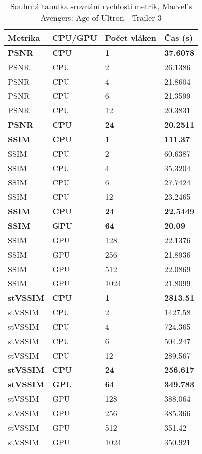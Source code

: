 \documentclass[thesis=M,czech]{FITthesis}[2016/06/26]
\begin{document}
\begin{table}[]
\centering
\begin{tabular}{|l|l|l|l|}
\hline
Metrika & CPU/GPU & Počet vláken & Čas (s) \\ \hline
\textbf{PSNR}    & \textbf{CPU}     & \textbf{1}            & \textbf{37.6078} \\ \hline
PSNR    & CPU     & 2            & 26.1386 \\ \hline
PSNR    & CPU     & 4            & 21.8604 \\ \hline
PSNR    & CPU     & 6            & 21.3599 \\ \hline
PSNR    & CPU     & 12           & 20.3831 \\ \hline
\textbf{PSNR}    & \textbf{CPU}     & \textbf{24}           & \textbf{20.2511} \\ \hline
\textbf{SSIM}    & \textbf{CPU}     & \textbf{1}            & \textbf{111.37}  \\ \hline
SSIM    & CPU     & 2            & 60.6387 \\ \hline
SSIM    & CPU     & 4            & 35.3204 \\ \hline
SSIM    & CPU     & 6            & 27.7424 \\ \hline
SSIM    & CPU     & 12           & 23.2465 \\ \hline
\textbf{SSIM}    & \textbf{CPU}     & \textbf{24}           & \textbf{22.5449} \\ \hline
\textbf{SSIM}    & \textbf{GPU}     & \textbf{64}           & \textbf{20.09}   \\ \hline
SSIM    & GPU     & 128          & 22.1376 \\ \hline
SSIM    & GPU     & 256          & 21.8936 \\ \hline
SSIM    & GPU     & 512          & 22.0869 \\ \hline
SSIM    & GPU     & 1024         & 21.8099 \\ \hline
\textbf{stVSSIM} & \textbf{CPU}     & \textbf{1}            & \textbf{2813.51} \\ \hline
stVSSIM & CPU     & 2            & 1427.58 \\ \hline
stVSSIM & CPU     & 4            & 724.365 \\ \hline
stVSSIM & CPU     & 6            & 504.247 \\ \hline
stVSSIM & CPU     & 12           & 289.567 \\ \hline
\textbf{stVSSIM} & \textbf{CPU}     & \textbf{24}           & \textbf{256.617} \\ \hline
\textbf{stVSSIM} & \textbf{GPU}     & \textbf{64}          & \textbf{349.783} \\ \hline
stVSSIM & GPU     & 128          & 388.064 \\ \hline
stVSSIM & GPU     & 256          & 385.366 \\ \hline
stVSSIM & GPU     & 512          & 351.42  \\ \hline
stVSSIM & GPU     & 1024         & 350.921 \\ \hline
\end{tabular}
\caption{Souhrná tabulka srovnání rychlosti metrik, Marvel's Avengers: Age of Ultron - Trailer 3} \label{tab:compare_metrics}
\end{table}  
\end{document}
